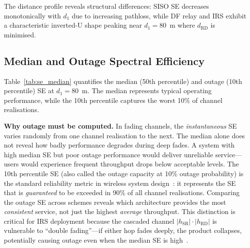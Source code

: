 \documentclass[journal]{IEEEtran} %
\begin{document}
The distance profile reveals structural differences: SISO SE decreases monotonically with $d_1$ due to increasing pathloss, while DF relay and IRS exhibit a characteristic inverted-U shape peaking near $d_1 = 80$~m where $d_{\mathrm{RD}}$ is minimised.

\subsection{Median and Outage Spectral Efficiency}
\label{sec:results_median_outage}

Table~\ref{tab:se_median} quantifies the median (50th percentile) and outage (10th percentile) SE at $d_1 = 80$~m. The median represents typical operating performance, while the 10th percentile captures the worst 10\% of channel realisations.

\textbf{Why outage must be computed.} In fading channels, the \textit{instantaneous} SE varies randomly from one channel realisation to the next. The median alone does not reveal how badly performance degrades during deep fades. A system with high median SE but poor outage performance would deliver unreliable service---users would experience frequent throughput drops below acceptable levels. The 10th percentile SE (also called the outage capacity at 10\% outage probability) is the standard reliability metric in wireless system design~\cite{goldsmith2005wireless,tse2005fundamentals}: it represents the SE that is \textit{guaranteed} to be exceeded in 90\% of all channel realisations. Comparing the outage SE across schemes reveals which architecture provides the most \textit{consistent} service, not just the highest \textit{average} throughput. This distinction is critical for IRS deployment because the cascaded channel $|h_{\mathrm{SR}}| \cdot |h_{\mathrm{RD}}|$ is vulnerable to ``double fading''---if either hop fades deeply, the product collapses, potentially causing outage even when the median SE is high~\cite{basar2019wireless}.

\begin{table}[t]
\centering
\caption{Spectral Efficiency at $d_1 = 80$~m, $N = 200$ [bit/s/Hz]}
\label{tab:se_median}
\end{table}
\end{document}
